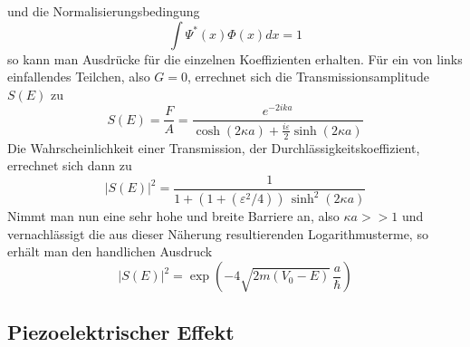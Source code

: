 und die Normalisierungsbedingung
\[
    \int \Psi^* (x) \Phi (x) dx = 1
\]
so kann man Ausdrücke für die einzelnen Koeffizienten erhalten. Für ein von links 
einfallendes Teilchen, also $G=0$, errechnet sich die Transmissionsamplitude 
$S(E)$ zu
\[
    S(E) = \frac{F}{A} = \frac{e^{-2ika}}{\cosh(2\kappa a) + \frac{i \varepsilon}{2}
                               \sinh(2\kappa a)}
\]
Die Wahrscheinlichkeit einer Transmission, der Durchlässigkeitskoeffizient, 
errechnet sich dann zu
\[
    | S(E) |^2 = \frac{1}{1+(1+(\varepsilon^2/4)) \, \sinh^2(2\kappa a)}
\]
Nimmt man nun eine sehr hohe und breite Barriere an, also $\kappa a >> 1$ und 
vernachlässigt die aus dieser Näherung resultierenden Logarithmusterme, so erhält
man den handlichen Ausdruck
\[
    | S(E) |^2 = \exp\left(-4 \sqrt{2m(V_0-E)} \, \frac{a}{\hbar}\right)
\]
\cite{schwabl}
\newpage

    \subsection{Piezoelektrischer Effekt}


